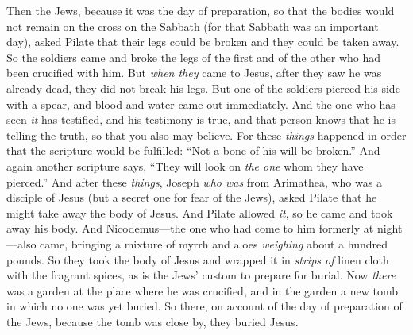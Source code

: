 \begin{biblechapter}
\verse Then the Jews, because it was the day of preparation, so that the bodies would not remain on the cross on the Sabbath (for that Sabbath was an important day), asked Pilate that their legs could be broken and they could be taken away.
\verse So the soldiers came and broke the legs of the first and of the other who had been crucified with him.
\verse But \textit{when they} came to Jesus, after they saw he was already dead, they did not break his legs.
\verse But one of the soldiers pierced his side with a spear, and blood and water came out immediately.
\verse And the one who has seen \textit{it} has testified, and his testimony is true, and that person knows that he is telling the truth, so that you also may believe.
\verse For these \textit{things} happened in order that the scripture would be fulfilled: “Not a bone of his will be broken.”
\verse And again another scripture says, “They will look on \textit{the one} whom they have pierced.”
 And after these \textit{things}, Joseph \textit{who was} from Arimathea, who was a disciple of Jesus (but a secret one for fear of the Jews), asked Pilate that he might take away the body of Jesus. And Pilate allowed \textit{it}, so he came and took away his body.
\verse And Nicodemus—the one who had come to him formerly at night—also came, bringing a mixture of myrrh and aloes \textit{weighing} about a hundred pounds.
\verse So they took the body of Jesus and wrapped it in \textit{strips of} linen cloth with the fragrant spices, as is the Jews’ custom to prepare for burial.
\verse Now \textit{there} was a garden at the place where he was crucified, and in the garden a new tomb in which no one was yet buried.
\verse So there, on account of the day of preparation of the Jews, because the tomb was close by, they buried Jesus.
\end{biblechapter}

